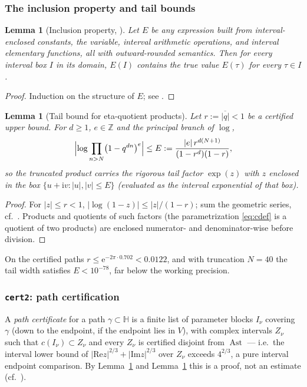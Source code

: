 \documentclass[11pt]{article}
\newcommand{\Zz}{\mathbb{Z}}
\newcommand{\Hh}{\mathbb{H}}
\newcommand{\ii}{\mathrm{i}}
\newcommand{\e}{\mathrm{e}}
\newcommand{\ReT}{\mathrm{Re}}
\newcommand{\ImT}{\mathrm{Im}}
\DeclareMathOperator{\Ast}{Ast}
\newtheorem{lemma}[theorem]{Lemma}
\theoremstyle{definition}
\theoremstyle{remark}
\begin{document}
\subsubsection{The inclusion property and tail bounds}\label{subsec:incl}

\begin{lemma}[Inclusion property, {\cite{MoKC}}]\label{lem:incl}
Let $E$ be any expression built from interval-enclosed constants, the
variable, interval arithmetic operations, and interval elementary
functions, all with outward-rounded semantics. Then for every
interval box $I$ in its domain, $E(I)$ contains the true value
$E(\tau)$ for every $\tau\in I$.
\end{lemma}
\begin{proof}
Induction on the structure of $E$; see \cite[Lemma~6.1]{Zf}.
\end{proof}

\begin{lemma}[Tail bound for eta-quotient products]\label{lem:tail}
Let $r:=\overline{|q|}<1$ be a certified upper bound. For
$d\ge1$, $e\in\Zz$ and the principal branch of $\log$,
\[
  \Bigl|\log\prod_{n>N}\bigl(1-q^{dn}\bigr)^{e}\Bigr|
  \le E:=\frac{|e|\,r^{d(N+1)}}{(1-r^d)(1-r)},
\]
so the truncated product carries the rigorous tail factor
$\exp(z)$ with $z$ enclosed in the box $\{u+\ii v:|u|,|v|\le E\}$
(evaluated as the interval exponential \emph{of that box}).
\end{lemma}
\begin{proof}
For $|z|\le r<1$, $|\log(1-z)|\le|z|/(1-r)$; sum the geometric
series, cf.\ \cite[Lemma~6.2]{Zf}. Products and quotients of such
factors (the parametrization \eqref{eq:cdef} is a quotient of two
products) are enclosed numerator- and denominator-wise before
division.
\end{proof}

On the certified paths $r\le\e^{-2\pi\cdot0.702}<0.0122$, and with
truncation $N=40$ the tail width satisfies $E<10^{-78}$, far below
the working precision.

\subsubsection{\texttt{cert2}: path certification}\label{subsec:cert2}

A \emph{path certificate} for a path $\gamma\subset\Hh$ is a finite
list of parameter blocks $I_\nu$ covering $\gamma$ (down to the
endpoint, if the endpoint lies in $V$), with complex intervals
$Z_\nu$ such that $c(I_\nu)\subset Z_\nu$ and every $Z_\nu$ is
certified disjoint from $\Ast$ --- i.e.\ the interval lower bound of
$|\ReT z|^{2/3}+|\ImT z|^{2/3}$ over $Z_\nu$ exceeds $4^{2/3}$,
a pure interval endpoint comparison. By Lemma~\ref{lem:incl} and
Lemma~\ref{lem:tail} this is a proof, not an estimate
(cf.\ \cite[Prop.~6.4]{Zf}).
\end{document}

